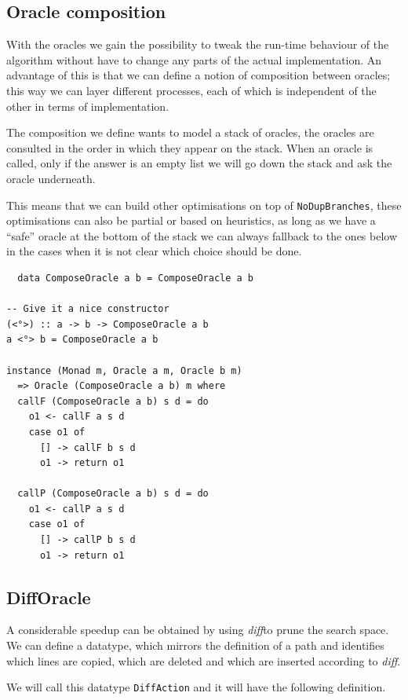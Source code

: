\documentclass[11pt, titlepage]{article}
\newcommand{\diff}{\emph{diff}}
\begin{document}
\subsection{Oracle composition}

With the oracles we gain the possibility to tweak the run-time behaviour of the 
algorithm without have to change any parts of the actual implementation.
An advantage of this is that we can define a notion of 
composition between oracles; this way we can layer different processes, each of 
which is independent of the other in terms of implementation.

The composition we define wants to model a stack of oracles, the oracles are consulted in the order in which they appear on the stack. When an oracle is called, only if the answer is an empty list we will go down the stack and ask the oracle underneath. 

This means that we can build other optimisations on top of \texttt{NoDupBranches}, these optimisations can also be partial or based on heuristics, as long as we have a ``safe'' oracle at the bottom of the stack we can always fallback to the ones below in the cases when it is not clear which choice should be done.

\begin{verbatim}
  data ComposeOracle a b = ComposeOracle a b

-- Give it a nice constructor
(<°>) :: a -> b -> ComposeOracle a b
a <°> b = ComposeOracle a b

instance (Monad m, Oracle a m, Oracle b m) 
  => Oracle (ComposeOracle a b) m where
  callF (ComposeOracle a b) s d = do
    o1 <- callF a s d
    case o1 of
      [] -> callF b s d
      o1 -> return o1

  callP (ComposeOracle a b) s d = do
    o1 <- callP a s d
    case o1 of
      [] -> callP b s d
      o1 -> return o1
\end{verbatim}

\subsection{DiffOracle}
A considerable speedup can be obtained by using \diff to prune the 
search space. We can define a datatype, which mirrors the definition of a path 
and identifies which lines are copied, which are deleted and which are inserted 
according to \diff.

We will call this datatype \texttt{DiffAction} and it will have the following 
definition.
\end{document}
